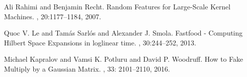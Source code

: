 \documentclass[11pt]{article}
\begin{document}


\begin{thebibliography}{42}

Ali Rahimi and Benjamin Recht. \newblock Random Features for Large-Scale Kernel Machines. , 20:1177--1184, 2007.

Quoc V. Le and Tam{\'{a}}s Sarl{\'{o}}s and Alexander J. Smola. \newblock Fastfood - Computing Hilbert Space Expansions in loglinear time. , 30:244--252, 2013.

Michael Kapralov and Vamsi K. Potluru and David P. Woodruff. \newblock How to Fake Multiply by a Gaussian Matrix. , 33: 2101--2110, 2016.
\end{thebibliography}
\end{document}
